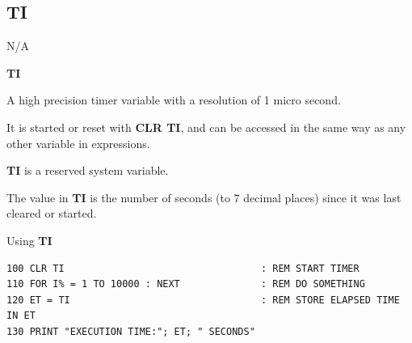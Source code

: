 
\newpage
\subsection{TI}
\begin{description}[leftmargin=2cm,style=nextline]
\item [Token:]    N/A

\item [Format:]   {\bf TI}

\item [Usage:]    A high precision timer variable with a resolution of 1 micro second.

                  It is started or reset with {\bf CLR TI}, and can be accessed in the same way as any other variable in expressions.

\item [Remarks:]  {\bf TI} is a reserved system variable.

                  The value in {\bf TI} is the number of seconds (to 7 decimal places) since it was last cleared or started.

\item [Example:]  Using {\bf TI}

\begin{tcolorbox}[colback=black,coltext=white]
\verbatimfont{\codefont}
\begin{verbatim}
100 CLR TI                                  : REM START TIMER
110 FOR I% = 1 TO 10000 : NEXT              : REM DO SOMETHING
120 ET = TI                                 : REM STORE ELAPSED TIME IN ET
130 PRINT "EXECUTION TIME:"; ET; " SECONDS"
\end{verbatim}
\end{tcolorbox}
\end{description}


\newpage

